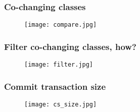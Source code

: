 \documentclass{beamer}
\begin{document}

\begin{frame}
\frametitle{Co-changing classes}
\vskip 0.2cm
\begin{center}
     \begin{figure}
	\texttt{[image: compare.jpg]}
     \end{figure}
\end{center}

\end{frame}


 \begin{frame}
\frametitle{Filter co-changing classes, how?}
\vskip 0.2cm
\begin{center}
     \begin{figure}
	\texttt{[image: filter.jpg]}
     \end{figure}
\end{center}

\end{frame}


 \begin{frame}
\frametitle{Commit transaction size}
\vskip 0.2cm
\begin{center}
     \begin{figure}
	\texttt{[image: cs\_size.jpg]}
     \end{figure}
\end{center}

\end{frame}

\end{document}
